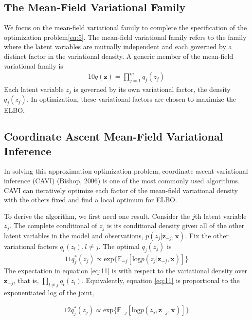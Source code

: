 \documentclass[letterpaper]{article}
\newcommand{\bz}{\mathbf{z}}
\newcommand{\bx}{\mathbf{x}}
\begin{document}
\subsection{The Mean-Field Variational Family}

We focus on the mean-field variational family to complete the specification of the optimization problem\eqref{eq:5}. The mean-field variational family refers to the family where the latent variables are mutually independent and each governed by a distinct factor in the variational density. A generic member of the mean-field variational family is
\begin{alignat}{10}\label{eq:10}
q(\bz) = \prod_{j=1}^m q_j(z_j)
\end{alignat}
Each latent variable $z_j$ is governed by its own variational factor, the density $q_j(z_j)$. In optimization, these variational factors are chosen to maximize the ELBO.

\subsection{Coordinate Ascent Mean-Field Variational Inference}

In solving this approximation optimization problem, coordinate ascent variational inference (CAVI) (Bishop, 2006) is one of the most commonly used algorithms. CAVI can iteratively optimize each factor of the mean-field variational density with the others fixed and find a local optimum for ELBO.

To derive the algorithm, we first need one result. Consider the $j$th latent variable $z_j$. The complete conditional of $z_j$ is its conditional density given all of the other latent variables in the model and observations, $p(z_j | \bz_{-j}, \bx)$. Fix the other variational factors $q_l (z_l), l\neq j$. The optimal $q_j(z_j)$ is
\begin{alignat}{11}\label{eq:11}
q^{\ast}_j (z_j) \propto \mathrm{exp}\{\mathbb{E}_{-j} [\mathrm{log}p(z_j | \bz_{-j}, \bx)]\}
\end{alignat}
The expectation in equation \eqref{eq:11} is with respect to the variational density over $\bz_{-j}$, that is, $\prod_{l\neq j} q_l (z_l)$. Equivalently, equation \eqref{eq:11} is proportional to the exponentiated log of the joint,

\begin{alignat}{12}\label{eq:12}
q^{\ast}_j (z_j) \propto \mathrm{exp}\{\mathbb{E}_{-j} [\mathrm{log}p(z_j , \bz_{-j}, \bx)]\}
\end{alignat}
\end{document}
